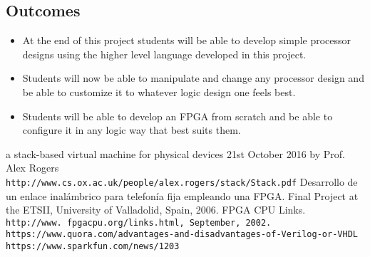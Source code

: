 \documentclass{article}
\begin{document}
\begin{flushleft}
\section{Outcomes}
\begin{itemize}
\item At the end of this project students will be able to develop simple processor designs using the higher level language developed in this project.
\end{itemize}
\begin{itemize}
\item Students will now be able to manipulate and change any processor design and be able to customize it to whatever logic design one feels best.
\end{itemize}
\begin{itemize}
\item Students will be able to develop an FPGA from scratch and be able to configure it in any logic way that best suits them.
\end{itemize}
\end{flushleft}

\begin{thebibliography}{9}

a stack-based virtual machine for physical devices 21st October 2016
by Prof. Alex Rogers
\\\texttt{http://www.cs.ox.ac.uk/people/alex.rogers/stack/Stack.pdf}
Desarrollo de un enlace inalámbrico para telefonía fija empleando una FPGA. Final Project at the ETSII, University of Valladolid, Spain, 2006. 
FPGA CPU Links.
\\\texttt{http://www. fpgacpu.org/links.html, September, 2002.}
\bibitem{}
\texttt{https://www.quora.com/advantages-and-disadvantages-of-Verilog-or-VHDL}
\bibitem{}
\texttt{https://www.sparkfun.com/news/1203}
\end{thebibliography}
\end{document}
